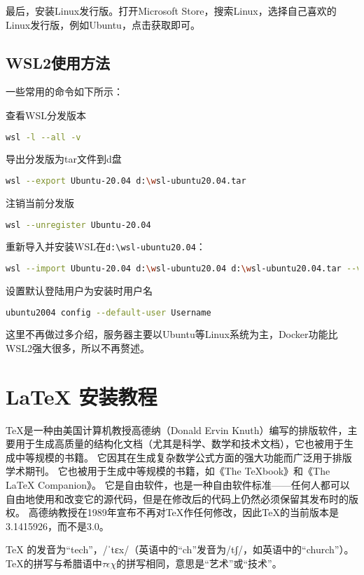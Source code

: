 \documentclass[lang=cn,a4paper,newtx]{elegantpaper}
\begin{document}
最后，安装Linux发行版。打开Microsoft Store，搜索Linux，选择自己喜欢的Linux发行版，例如Ubuntu，点击获取即可。

\subsection{WSL2使用方法}
一些常用的命令如下所示：

查看WSL分发版本
\begin{lstlisting}[language=bash]
  wsl -l --all -v
\end{lstlisting}

导出分发版为tar文件到d盘
\begin{lstlisting}[language=bash]
  wsl --export Ubuntu-20.04 d:\wsl-ubuntu20.04.tar
\end{lstlisting}

注销当前分发版
\begin{lstlisting}[language=bash]
  wsl --unregister Ubuntu-20.04
\end{lstlisting}

重新导入并安装WSL在\verb|d:\wsl-ubuntu20.04|：
\begin{lstlisting}[language=bash]
  wsl --import Ubuntu-20.04 d:\wsl-ubuntu20.04 d:\wsl-ubuntu20.04.tar --version 2
\end{lstlisting}

设置默认登陆用户为安装时用户名
\begin{lstlisting}[language=bash]
  ubuntu2004 config --default-user Username
\end{lstlisting}

这里不再做过多介绍，服务器主要以Ubuntu等Linux系统为主，Docker功能比WSL2强大很多，所以不再赘述。
\section{\LaTeX{} 安装教程}
\TeX{}是一种由美国计算机教授高德纳（Donald Ervin Knuth）编写的排版软件，主要用于生成高质量的结构化文档（尤其是科学、数学和技术文档），它也被用于生成中等规模的书籍。
它因其在生成复杂数学公式方面的强大功能而广泛用于排版学术期刊。
它也被用于生成中等规模的书籍，如《The \TeX{}book》和《The \LaTeX{} Companion》。
它是自由软件，也是一种自由软件标准——任何人都可以自由地使用和改变它的源代码，但是在修改后的代码上仍然必须保留其发布时的版权。
高德纳教授在1989年宣布不再对\TeX{}作任何修改，因此\TeX{}的当前版本是3.1415926，而不是3.0。

\TeX{} 的发音为“tech”，/ˈtɛx/（英语中的“ch”发音为/tʃ/，如英语中的“church”）。\TeX{}的拼写与希腊语中$\tau\epsilon\chi$的拼写相同，意思是“艺术”或“技术”。
\end{document}
